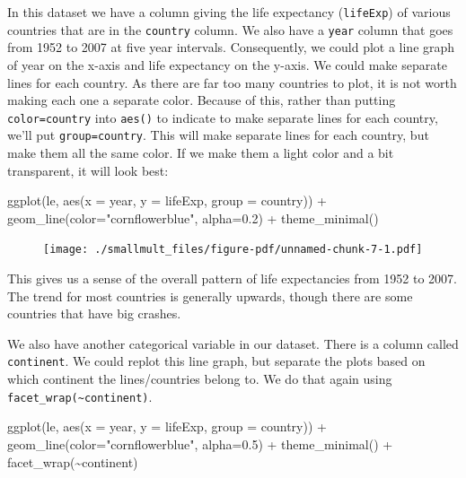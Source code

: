 \documentclass[
  letterpaper,
  DIV=11,
  numbers=noendperiod]{scrreprt}
\newenvironment{Shaded}{\begin{snugshade}}{\end{snugshade}}
\newcommand{\AttributeTok}[1]{\textcolor[rgb]{0.40,0.45,0.13}{#1}}
\newcommand{\FloatTok}[1]{\textcolor[rgb]{0.68,0.00,0.00}{#1}}
\newcommand{\FunctionTok}[1]{\textcolor[rgb]{0.28,0.35,0.67}{#1}}
\newcommand{\NormalTok}[1]{\textcolor[rgb]{0.00,0.23,0.31}{#1}}
\newcommand{\SpecialCharTok}[1]{\textcolor[rgb]{0.37,0.37,0.37}{#1}}
\newcommand{\StringTok}[1]{\textcolor[rgb]{0.13,0.47,0.30}{#1}}
\begin{document}
In this dataset we have a column giving the life expectancy
(\texttt{lifeExp}) of various countries that are in the \texttt{country}
column. We also have a \texttt{year} column that goes from 1952 to 2007
at five year intervals. Consequently, we could plot a line graph of year
on the x-axis and life expectancy on the y-axis. We could make separate
lines for each country. As there are far too many countries to plot, it
is not worth making each one a separate color. Because of this, rather
than putting \texttt{color=country} into \texttt{aes()} to indicate to
make separate lines for each country, we'll put \texttt{group=country}.
This will make separate lines for each country, but make them all the
same color. If we make them a light color and a bit transparent, it will
look best:

\begin{Shaded}
\begin{Highlighting}[]
\FunctionTok{ggplot}\NormalTok{(le, }\FunctionTok{aes}\NormalTok{(}\AttributeTok{x =}\NormalTok{ year, }\AttributeTok{y =}\NormalTok{ lifeExp, }\AttributeTok{group =}\NormalTok{ country)) }\SpecialCharTok{+} 
  \FunctionTok{geom\_line}\NormalTok{(}\AttributeTok{color=}\StringTok{"cornflowerblue"}\NormalTok{, }\AttributeTok{alpha=}\FloatTok{0.2}\NormalTok{) }\SpecialCharTok{+}
  \FunctionTok{theme\_minimal}\NormalTok{()}
\end{Highlighting}
\end{Shaded}

\begin{figure}[H]

{\centering \texttt{[image: ./smallmult\_files/figure-pdf/unnamed-chunk-7-1.pdf]}

}

\end{figure}

This gives us a sense of the overall pattern of life expectancies from
1952 to 2007. The trend for most countries is generally upwards, though
there are some countries that have big crashes.

We also have another categorical variable in our dataset. There is a
column called \texttt{continent}. We could replot this line graph, but
separate the plots based on which continent the lines/countries belong
to. We do that again using
\texttt{facet\_wrap(\textasciitilde{}continent)}.

\begin{Shaded}
\begin{Highlighting}[]
\FunctionTok{ggplot}\NormalTok{(le, }\FunctionTok{aes}\NormalTok{(}\AttributeTok{x =}\NormalTok{ year, }\AttributeTok{y =}\NormalTok{ lifeExp, }\AttributeTok{group =}\NormalTok{ country)) }\SpecialCharTok{+} 
  \FunctionTok{geom\_line}\NormalTok{(}\AttributeTok{color=}\StringTok{"cornflowerblue"}\NormalTok{, }\AttributeTok{alpha=}\FloatTok{0.5}\NormalTok{) }\SpecialCharTok{+}
  \FunctionTok{theme\_minimal}\NormalTok{() }\SpecialCharTok{+}
  \FunctionTok{facet\_wrap}\NormalTok{(}\SpecialCharTok{\textasciitilde{}}\NormalTok{continent)}
\end{Highlighting}
\end{Shaded}
\end{document}
